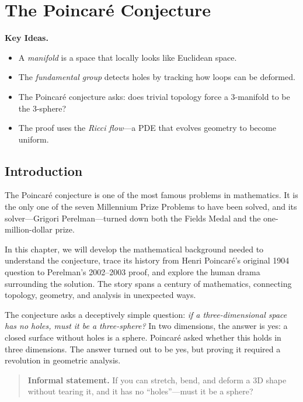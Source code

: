 \chapter{The Poincar\'{e} Conjecture}
\label{ch:poincare}

\noindent\textbf{Key Ideas.}
\begin{itemize}
  \item A \emph{manifold} is a space that locally looks like Euclidean space.
  \item The \emph{fundamental group} detects holes by tracking how loops can be deformed.
  \item The Poincar\'{e} conjecture asks: does trivial topology force a 3-manifold to be the 3-sphere?
  \item The proof uses the \emph{Ricci flow}---a PDE that evolves geometry to become uniform.
\end{itemize}

\bigskip

\section{Introduction}

The Poincar\'{e} conjecture is one of the most famous problems in mathematics. It is the only one of the seven Millennium Prize Problems to have been solved, and its solver---Grigori Perelman---turned down both the Fields Medal and the one-million-dollar prize.

In this chapter, we will develop the mathematical background needed to understand the conjecture, trace its history from Henri Poincar\'{e}'s original 1904 question to Perelman's 2002--2003 proof, and explore the human drama surrounding the solution. The story spans a century of mathematics, connecting topology, geometry, and analysis in unexpected ways.

The conjecture asks a deceptively simple question: \emph{if a three-dimensional space has no holes, must it be a three-sphere?} In two dimensions, the answer is yes: a closed surface without holes is a sphere. Poincar\'{e} asked whether this holds in three dimensions. The answer turned out to be yes, but proving it required a revolution in geometric analysis.

\begin{quote}
\textbf{Informal statement.} If you can stretch, bend, and deform a 3D shape without tearing it, and it has no ``holes''---must it be a sphere?
\end{quote}

